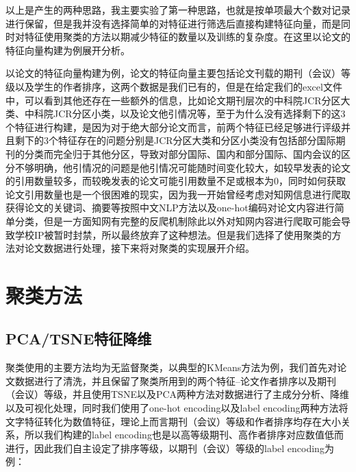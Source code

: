 以上是产生的两种思路，我主要实验了第一种思路，也就是按单项最大个数对记录进行保留，但是我并没有选择简单的对特征进行筛选后直接构建特征向量，而是同时对特征使用聚类的方法以期减少特征的数量以及训练的复杂度。在这里以论文的特征向量构建为例展开分析。

以论文的特征向量构建为例，论文的特征向量主要包括论文刊载的期刊（会议）等级以及学生的作者排序，这两个数据是我们已有的，但是在给定我们的excel文件中，可以看到其他还存在一些额外的信息，比如论文期刊层次的中科院JCR分区大类、中科院JCR分区小类，以及论文他引情况等，至于为什么没有选择剩下的这3个特征进行构建，是因为对于绝大部分论文而言，前两个特征已经足够进行评级并且剩下的3个特征存在的问题分别是JCR分区大类和分区小类没有包括部分国际期刊的分类而完全归于其他分区，导致对部分国际、国内和部分国际、国内会议的区分不够明确，他引情况的问题是他引情况可能随时间变化较大，如较早发表的论文的引用数量较多，而较晚发表的论文可能引用数量不足或根本为0，同时如何获取论文引用数量也是一个很困难的现实，因为我一开始曾经考虑对知网信息进行爬取获得论文的关键词、摘要等按照中文NLP方法以及one-hot编码对论文内容进行简单分类，但是一方面知网有完整的反爬机制除此以外对知网内容进行爬取可能会导致学校IP被暂时封禁，所以最终放弃了这种想法。但是我们选择了使用聚类的方法对论文数据进行处理，接下来将对聚类的实现展开介绍。 

\section{聚类方法}

\subsection{PCA/TSNE特征降维}

聚类使用的主要方法均为无监督聚类，以典型的KMeans方法为例，我们首先对论文数据进行了清洗，并且保留了聚类所用到的两个特征--论文作者排序以及期刊（会议）等级，并且使用TSNE以及PCA两种方法对数据进行了主成分分析、降维以及可视化处理，同时我们使用了one-hot encoding以及label encoding两种方法将文字特征转化为数值特征，理论上而言期刊（会议）等级和作者排序均存在大小关系，所以我们构建的label encoding也是以高等级期刊、高作者排序对应数值低而进行，因此我们自主设定了排序等级，以期刊（会议）等级的label encoding为例：






